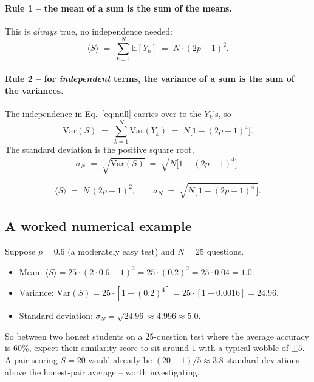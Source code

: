 \documentclass[11pt,a4paper]{article}
\newcommand{\Exp}{\mathbb{E}}
\newcommand{\Var}{\mathrm{Var}}
\begin{document}
\paragraph{Rule 1 -- the mean of a sum is the sum of the means.}
This is \emph{always} true, no independence needed:
\begin{equation}
  \langle S\rangle \;=\; \sum_{k=1}^{N}\Exp[Y_k]
                   \;=\; N\cdot(2p-1)^2.
  \label{eq:ES}
\end{equation}

\paragraph{Rule 2 -- for \emph{independent} terms, the variance of a
sum is the sum of the variances.} The independence in
Eq.~\eqref{eq:null} carries over to the $Y_k$'s, so
\begin{equation}
  \Var(S) \;=\; \sum_{k=1}^{N}\Var(Y_k)
          \;=\; N\bigl[1-(2p-1)^4\bigr].
  \label{eq:VarS}
\end{equation}
The standard deviation is the positive square root,
\begin{equation}
  \sigma_N \;=\; \sqrt{\Var(S)} \;=\; \sqrt{N\bigl[1-(2p-1)^4\bigr]}.
  \label{eq:sigmaN}
\end{equation}

\begin{keyresult}
\begin{equation}
  \boxed{\;
  \langle S\rangle \;=\; N\,(2p-1)^2,
  \qquad
  \sigma_N \;=\; \sqrt{N\bigl[\,1 - (2p-1)^4\,\bigr]}.
  \;}
  \label{eq:final}
\end{equation}
\end{keyresult}

\subsection{A worked numerical example}
Suppose $p = 0.6$ (a moderately easy test) and $N = 25$ questions.
\begin{itemize}[leftmargin=2em,nosep]
  \item Mean: $\langle S\rangle = 25\cdot(2\cdot 0.6 - 1)^2
        = 25\cdot(0.2)^2 = 25\cdot 0.04 = 1.0$.
  \item Variance:
        $\Var(S) = 25\cdot[1 - (0.2)^4] = 25\cdot[1 - 0.0016] = 24.96$.
  \item Standard deviation:
        $\sigma_N = \sqrt{24.96} \approx 4.996 \approx 5.0$.
\end{itemize}
So between two honest students on a $25$-question test where the
average accuracy is $60\%$, expect their similarity score to sit
around $1$ with a typical wobble of $\pm 5$. A pair scoring $S = 20$
would already be $(20 - 1)/5 \approx 3.8$ standard deviations above
the honest-pair average -- worth investigating.
\end{document}
